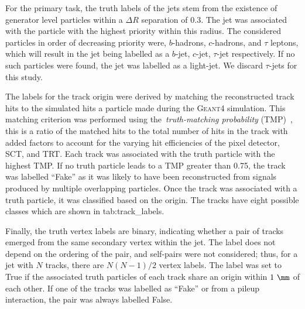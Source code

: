For the primary task, the truth labels of the jets stem from the existence of generator level particles within a $\Delta R$ separation of 0.3.
The jet was associated with the particle with the highest priority within this radius.
The considered particles in order of decreasing priority were, $b$-hadrons, $c$-hadrons, and $\tau$ leptons, which will result in the jet being labelled as a $b$-jet, $c$-jet, $\tau$-jet respectively.
If no such particles were found, the jet was labelled as a light-jet.
We discard $\tau$-jets for this study.

The labels for the track origin were derived by matching the reconstructed track hits to the simulated hits a particle made during the \textsc{Geant4} simulation.
This matching criterion was performed using the~\textit{truth-matching probability} (TMP)~\cite{PerformanceATLASTrack}, this is a ratio of the matched hits to the total number of hits in the track with added factors to account for the varying hit efficiencies of the pixel detector, SCT, and TRT\@.
Each track was associated with the truth particle with the highest TMP\@.
If no truth particle leads to a TMP greater than 0.75, the track was labelled ``Fake'' as it was likely to have been reconstructed from signals produced by multiple overlapping particles.
Once the track was associated with a truth particle, it was classified based on the origin.
The tracks have eight possible classes which are shown in \Cref
{tab:track_labels}.

Finally, the truth vertex labels are binary, indicating whether a pair of tracks emerged from the same secondary vertex within the jet.
The label does not depend on the ordering of the pair, and self-pairs were not considered; thus, for a jet with $N$ tracks, there are $N(N-1)/2$ vertex labels.
The label was set to True if the associated truth particles of each track share an origin within $1~\mm$ of each other.
If one of the tracks was labelled as ``Fake'' or from a pileup interaction, the pair was always labelled False.

